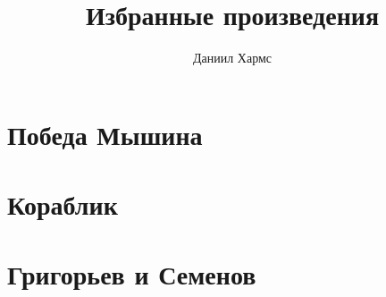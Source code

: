 \documentclass[a4paper,12pt]{article}
\title{Избранные произведения}
\author{Даниил Хармс}
\date{}
\begin{document}
\maketitle

\section{Победа Мышина}


\section{Кораблик}


\section{Григорьев и Семенов}

\end{document}
